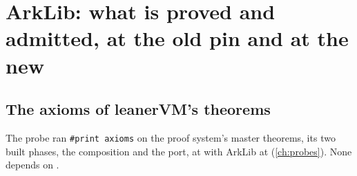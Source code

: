 \begingroup\sloppy
\section{ArkLib: what is proved and admitted, at the old pin and at the new}\label{sec:gen-lib-ark-pins}

\subsection{The axioms of leanerVM's theorems}\label{sec:gen-lib-ark-axioms}

The probe  ran \texttt{\#print axioms} on the proof system's master theorems,
its two built phases, the composition and the port, at  with ArkLib at
 (\cref{ch:probes}). None depends on .

